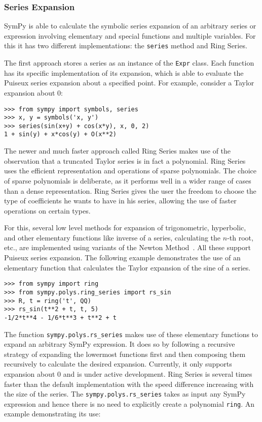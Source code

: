\subsubsection{Series Expansion}

SymPy is able to calculate the symbolic series expansion of an arbitrary series
or expression involving elementary and special functions and multiple
variables. For this it has two different implementations: the \texttt{series}
method and Ring Series.

The first approach stores a series as an instance of the \texttt{Expr} class.
Each function has its specific implementation of its expansion, which is able to
evaluate the Puiseux series expansion about a specified point. For example,
consider a Taylor expansion about 0:

\begin{verbatim}
>>> from sympy import symbols, series
>>> x, y = symbols('x, y')
>>> series(sin(x+y) + cos(x*y), x, 0, 2)
1 + sin(y) + x*cos(y) + O(x**2)
\end{verbatim}

The newer and much faster approach called Ring Series makes use of the
observation that a truncated Taylor series is in fact a polynomial.
Ring Series uses the efficient representation and operations of sparse
polynomials. The choice of sparse polynomials is deliberate, as it performs
well in a wider range of cases than a dense representation. Ring Series gives
the user the freedom to choose the type of coefficients he wants to have in
his series, allowing the use of faster operations on certain types.

For this, several low level methods for expansion of trigonometric, hyperbolic,
and other elementary functions like inverse of a series, calculating the $n$-th
root, etc., are implemented using variants of the Newton Method~\cite{zimmerman}.
All these support Puiseux series expansion. The following example demonstrates
the use of an elementary function that calculates the Taylor expansion of the
sine of a series.

\begin{verbatim}
>>> from sympy import ring
>>> from sympy.polys.ring_series import rs_sin
>>> R, t = ring('t', QQ)
>>> rs_sin(t**2 + t, t, 5)
-1/2*t**4 - 1/6*t**3 + t**2 + t
\end{verbatim}

The function \texttt{sympy.polys.rs\_series} makes use of these elementary
functions to expand an arbitrary SymPy expression. It does so by following a
recursive strategy of expanding the lowermost functions first and then
composing them recursively to calculate the desired expansion. Currently, it
only supports expansion about 0 and is under active development. Ring Series
is several times faster than the default implementation with the speed
difference increasing with the size of the series. The
\texttt{sympy.polys.rs\_series} takes as input any SymPy expression and hence
there is no need to explicitly create a polynomial \texttt{ring}. An example
demonstrating its use:

